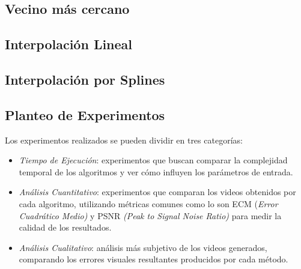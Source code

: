 \subsection{Vecino más cercano}



\subsection{Interpolación Lineal}



\subsection{Interpolación por Splines}



\subsection{Planteo de Experimentos}

\par Los experimentos realizados se pueden dividir en tres categorías:

\begin{itemize}
\item \emph{Tiempo de Ejecución}: experimentos que buscan comparar la complejidad temporal de los algoritmos y ver cómo influyen los parámetros de entrada.
\item \emph{Análisis Cuantitativo}: experimentos que comparan los videos obtenidos por cada algoritmo, utilizando métricas comunes como lo son ECM (\textit{Error Cuadrático Medio)} y PSNR \textit{(Peak to Signal Noise Ratio)} para medir la calidad de los resultados.
\item \emph{Análisis Cualitativo}: análisis más subjetivo de los videos generados, comparando los errores visuales resultantes producidos por cada método.
\end{itemize}

